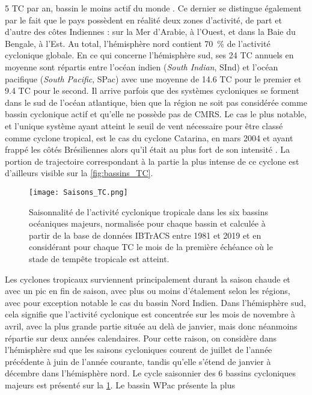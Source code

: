 \documentclass[../main.tex]{subfiles}
\begin{document}
\num{5} TC par an, bassin le moins actif du monde \parencite{gray_global_1968,lander_look_1998,schreck_impact_2014}. Ce dernier se distingue également par le
fait que le pays possèdent en réalité deux zones d'activité, de part et d'autre des côtes Indiennes : sur la Mer d'Arabie, à l'Ouest, et dans la Baie du
Bengale, à l'Est. Au total, l'hémisphère nord contient \SI{70}{\percent} de l'activité cyclonique globale. En ce qui concerne l'hémisphère sud, ses \num{24} TC
annuels en moyenne sont répartis entre l'océan indien (\textit{South Indian}, SInd) et l'océan pacifique (\textit{South Pacific}, SPac) avec une moyenne de
\num{14.6} TC pour le premier et \num{9.4} TC pour le second. Il arrive parfois que des systèmes cycloniques se forment dans le sud de l'océan atlantique, bien
que la région ne soit pas considérée comme bassin cyclonique actif et qu'elle ne possède pas de CMRS. Le cas le plus notable, et l'unique système ayant atteint
le seuil de vent nécessaire pour être classé comme cyclone tropical, est le cas du cyclone Catarina, en mars 2004 et ayant frappé les côtés Brésiliennes alors
qu'il était au plus fort de son intensité \parencite{mctaggart-cowan_analysis_2006}. La portion de trajectoire correspondant à la partie la plus intense de ce
cyclone est d'ailleurs visible sur la \cref{fig:bassins_TC}.
%
\begin{figure}[t]
    \centering
    \texttt{[image: Saisons\_TC.png]}
    \caption{Saisonnalité de l'activité cyclonique tropicale dans les six bassins océaniques majeurs, normalisée pour chaque bassin et calculée à partir de la
    base de données IBTrACS entre 1981 et 2019 et en considérant pour chaque TC le mois de la première échéance où le stade de tempête tropicale est atteint.}
    \label{fig:saisons_TC}
\end{figure}
%
Les cyclones tropicaux surviennent principalement durant la saison chaude et avec un pic en fin de saison, avec plus ou moins d'étalement selon les régions,
avec pour exception notable le cas du bassin Nord Indien. Dans l'hémisphère sud, cela signifie que l'activité cyclonique est concentrée sur les mois de novembre
à avril, avec la plus grande partie située au delà de janvier, mais donc néanmoins répartie sur deux années calendaires. Pour cette raison, on considère dans
l'hémisphère sud que les saisons cycloniques courent de juillet de l'année précédente à juin de l'année courante, tandis qu'elle s'étend de janvier à décembre
dans l'hémisphère nord. Le cycle saisonnier des \num{6} bassins cycloniques majeurs est présenté sur la \cref{fig:saisons_TC}. Le bassin WPac présente la plus
\end{document}

